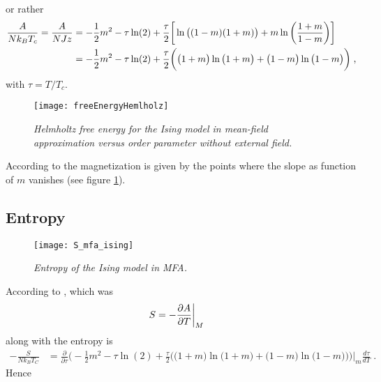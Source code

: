 %
or rather
%
\begin{align}\label{eq:sing:mfa:S}
\frac{A}{N k_{B} T_{c}}= \frac{A}{N J z}&=-\frac{1}{2} m^{2}
-\tau\ln(2) + \frac{\tau}{2}\bigg[\ln\big((1-m)(1+m) \big)
+ m \ln\bigg( \frac{1+m}{1-m} \bigg)\bigg]\notag\\
&=-\frac{1}{2} m^{2}
-\tau\ln(2) + \frac{\tau}{2}
\bigg( 
\big(1+m\big) \ln\big(1+m \big) + \big(1-m\big) \ln\big(1-m \big)
 \bigg)\;,
\end{align}
%
%
with $\tau =T/T_{c}$.
%
\begin{figure}[h]
\begin{center}
\texttt{[image: freeEnergyHemlholz]}
\caption{{\it Helmholtz free energy for the Ising model in mean-field approximation versus order parameter without external field.}\label{fig:freeEnergyHemlholz}}
\end{center}
\end{figure}
%
According to  the magnetization is given by the points where the slope as function of $m$ vanishes (see figure \ref{fig:freeEnergyHemlholz}).

\newpage 

\subsection{Entropy}


\begin{figure}[t]
\begin{center}
\texttt{[image: S\_mfa\_ising]}
\caption{{\it Entropy of the Ising model in MFA.}}
\end{center}
\end{figure}

According to  , which was
%
\begin{align*}
S &= -\frac{\partial A}{\partial T}\bigg|_{M} 
\end{align*}
%
along with 
the entropy is
%
\begin{align*}
-\frac{S}{N k_{B}T_{C}} &=
\frac{\partial }{\partial \tau} \bigg( 
-\frac{1}{2} m^{2}
-\tau\ln(2) + \frac{\tau}{2}
\bigg( 
\big(1+m\big) \ln\big(1+m \big) + \big(1-m\big) \ln\big(1-m \big)
 \bigg)
\bigg)\bigg|_{m} \frac{d \tau }{dT}\nonumber\;.
\end{align*}
%
Hence
%
%

